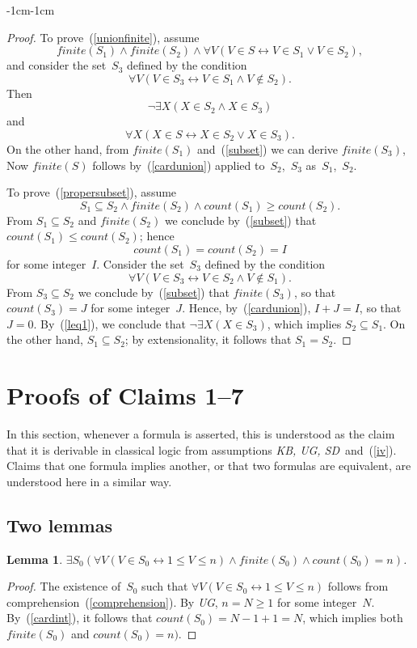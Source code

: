 \documentclass[11pt]{article}
\newtheorem{lemma}{Lemma}
\def\fnt{\mathit{finite}}
\def\lrar{\leftrightarrow}
\def\kbugsd{\emph{KB, UG, SD}}
\newcommand{\co}{\ensuremath{\mathit{count}}}
\begin{document}
\begin{adjustwidth}{-1cm}{-1cm}
\begin{proof}
To prove~(\ref{unionfinite}), assume
  $$
  \fnt(S_1) \land \fnt(S_2)
  \land\forall V(V\in S \lrar V\in S_1 \lor V\in S_2),$$
  and consider the set~$S_3$ defined by the condition
  $$\forall V(V\in S_3 \lrar V\in S_1 \land V\not\in S_2).$$
Then
$$\neg\exists X(X\in S_2\land X\in S_3)$$
and
$$\forall X(X\in S \lrar X\in S_2 \lor X\in S_3).$$
On the other hand, from $\fnt(S_1)$ and~(\ref{subset}) we can derive
$\fnt(S_3)$,
Now $\fnt(S)$ follows by~(\ref{cardunion}) applied to~$S_2$,~$S_3$
as~$S_1$,~$S_2$.


To prove~(\ref{propersubset}), assume
$$
S_1\subseteq S_2 \land \fnt(S_2) \land \co(S_1) \geq \co(S_2).
$$
From $S_1\subseteq S_2$ and $\fnt(S_2)$ we conclude by~(\ref{subset}) that
$\co(S_1) \leq \co(S_2)$; hence
$$\co(S_1)=\co(S_2)=I$$
for some integer~$I$.  Consider the set~$S_3$ defined by the condition
$$\forall V(V\in S_3 \lrar V\in S_2 \land V\not\in S_1).$$
From $S_3\subseteq S_2$ we conclude by~(\ref{subset}) that
$\fnt(S_3)$, so that $\co(S_3)=J$ for some integer~$J$.  Hence,
by~(\ref{cardunion}), $I+J=I$,
so that~$J=0$. By~(\ref{leq1}), we conclude that $\neg\exists X(X\in S_3)$,
which implies $S_2\subseteq S_1$.  On the other hand, $S_1\subseteq S_2$;
by extensionality, it follows that $S_1=S_2$.
\end{proof}

\section{Proofs of Claims 1--7}

In this section, whenever a formula is asserted,
this is understood as the claim
that it is derivable in classical logic from assumptions \kbugsd\
and~(\ref{iv}).  Claims that one formula
implies another, or that two formulas are equivalent, are understood here in a
similar way.

\subsection{Two lemmas}

\begin{lemma}\label{lem:S0}
$\exists S_0(\forall V(V\in S_0\lrar 1\leq V\leq n)
  \land \fnt(S_0) \land \co(S_0)=n)$.
\end{lemma}
\begin{proof}
  The existence of~$S_0$ such that
  $\forall V(V\in S_0\lrar 1\leq V\leq n)$
  follows from comprehension~(\ref{comprehension}).  By \emph{UG}, $n=N\geq 1$
  for some integer~$N$.  By~(\ref{cardint}), it follows that
$\co(S_0) = N-1+1=N$, which implies both $\fnt(S_0)$ and $\co(S_0)=n)$.
\end{proof}
  

\end{adjustwidth}
\end{document}
